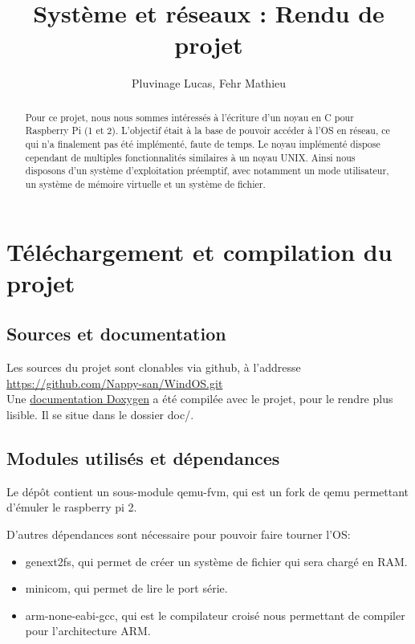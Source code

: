 \documentclass[a4paper]{article}
\author{Pluvinage Lucas, Fehr Mathieu}
\title{Système et réseaux : Rendu de projet}
\begin{document}
\maketitle

\begin{abstract}
  Pour ce projet, nous nous sommes intéressés à l'écriture d'un noyau en C pour
  Raspberry Pi (1 et 2). L'objectif était à la base de pouvoir accéder à l'OS en
  réseau, ce qui n'a finalement pas été implémenté, faute de temps. Le noyau
  implémenté dispose cependant de multiples fonctionnalités similaires à un noyau
  UNIX. Ainsi nous disposons d'un système d'exploitation préemptif, avec notamment
  un mode utilisateur, un système de mémoire virtuelle et un système de fichier.
\end{abstract}

\tableofcontents
\newpage

\section{Téléchargement et compilation du projet}
\subsection{Sources et documentation}

Les sources du projet sont clonables via github, à l'addresse
\href{https://github.com/Nappy-san/WindOS.git}{https://github.com/Nappy-san/WindOS.git}\\

Une \href{../doc/index.html}{documentation Doxygen} a été compilée avec le projet, pour le rendre plus
lisible. Il se situe dans le dossier doc/.

\subsection{Modules utilisés et dépendances}

Le dépôt contient un sous-module qemu-fvm, qui est un fork de qemu permettant d'émuler le raspberry pi 2.

D'autres dépendances sont nécessaire pour pouvoir faire tourner l'OS:
\begin{itemize}
\item genext2fs, qui permet de créer un système de fichier qui sera chargé en RAM.
\item minicom, qui permet de lire le port série.
\item arm-none-eabi-gcc, qui est le compilateur croisé nous permettant de compiler pour
l'architecture ARM.
\end{itemize}
\end{document}

